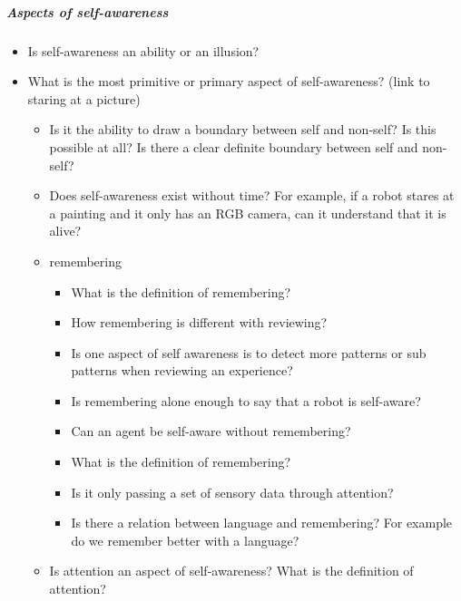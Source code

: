 \documentclass{book}
\begin{document}
\subparagraph{Aspects of self-awareness}
\begin{itemize}
    \item Is self-awareness an ability or an illusion?
\end{itemize}
\begin{itemize}
    \item What is the most primitive or primary aspect of self-awareness? (link to staring at a picture)
    \begin{itemize}
        \item Is it the ability to draw a boundary between self and non-self? Is this possible at all? Is there a clear definite boundary between self and non-self?
    \end{itemize}
    \begin{itemize}
        \item Does self-awareness exist without time? For example, if a robot stares at a painting and it only has an RGB camera, can it understand that it is alive?
        \item remembering
        \begin{itemize}
            \item What is the definition of remembering?
            \item How remembering is different with reviewing?
            \item Is one aspect of self awareness is to detect more patterns or sub patterns when reviewing an experience?
        \end{itemize}
        \begin{itemize}
            \item Is remembering alone enough to say that a robot is self-aware?
            \item Can an agent be self-aware without remembering?
            \item What is the definition of remembering?
            \item Is it only passing a set of sensory data through attention?
            \item Is there a relation between language and remembering? For example do we remember better with a language?
        \end{itemize}
        \item Is attention an aspect of self-awareness? What is the definition of attention?
    \end{itemize}
\end{itemize}
\end{document}
